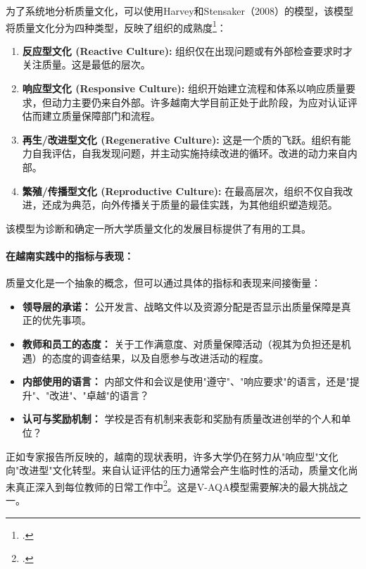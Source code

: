 为了系统地分析质量文化，可以使用Harvey和Stensaker（2008）的模型，该模型将质量文化分为四种类型，反映了组织的成熟度\footcite{HarveyStensaker}：
\begin{enumerate}
    \item \textbf{反应型文化 (Reactive Culture):} 组织仅在出现问题或有外部检查要求时才关注质量。这是最低的层次。
    \item \textbf{响应型文化 (Responsive Culture):} 组织开始建立流程和体系以响应质量要求，但动力主要仍来自外部。许多越南大学目前正处于此阶段，为应对认证评估而建立质量保障部门和流程。
    \item \textbf{再生/改进型文化 (Regenerative Culture):} 这是一个质的飞跃。组织有能力自我评估，自我发现问题，并主动实施持续改进的循环。改进的动力来自内部。
    \item \textbf{繁殖/传播型文化 (Reproductive Culture):} 在最高层次，组织不仅自我改进，还成为典范，向外传播关于质量的最佳实践，为其他组织塑造规范。
\end{enumerate}
该模型为诊断和确定一所大学质量文化的发展目标提供了有用的工具。

\paragraph{在越南实践中的指标与表现：}
质量文化是一个抽象的概念，但可以通过具体的指标和表现来间接衡量：
\begin{itemize}
    \item \textbf{领导层的承诺：} 公开发言、战略文件以及资源分配是否显示出质量保障是真正的优先事项。
    \item \textbf{教师和员工的态度：} 关于工作满意度、对质量保障活动（视其为负担还是机遇）的态度的调查结果，以及自愿参与改进活动的程度。
    \item \textbf{内部使用的语言：} 内部文件和会议是使用"遵守"、"响应要求"的语言，还是"提升"、"改进"、"卓越"的语言？
    \item \textbf{认可与奖励机制：} 学校是否有机制来表彰和奖励有质量改进创举的个人和单位？
\end{itemize}
正如专家报告所反映的，越南的现状表明，许多大学仍在努力从"响应型"文化向"改进型"文化转型。来自认证评估的压力通常会产生临时性的活动，质量文化尚未真正深入到每位教师的日常工作中\footcite{ExpertPerspectivesVN}。这是V-AQA模型需要解决的最大挑战之一。


